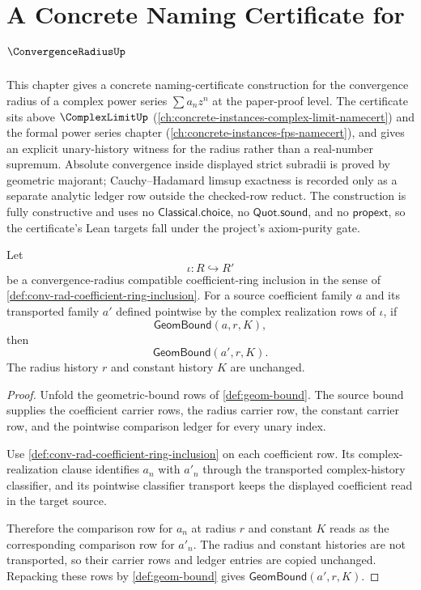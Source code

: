 \chapter{A Concrete Naming Certificate for \(\ConvergenceRadiusUp\)}
\label{ch:concrete-instances-convergence-radius-namecert}

This chapter gives a concrete naming-certificate construction for the convergence radius of a complex power series $\sum a_n z^n$ at the paper-proof level. The certificate sits above $\ComplexLimitUp$ (\autoref{ch:concrete-instances-complex-limit-namecert}) and the formal power series chapter (\autoref{ch:concrete-instances-fps-namecert}), and gives an explicit unary-history witness for the radius rather than a real-number supremum. Absolute convergence inside displayed strict subradii is proved by geometric majorant; Cauchy--Hadamard limsup exactness is recorded only as a separate analytic ledger row outside the checked-row reduct. The construction is fully constructive and uses no $\mathsf{Classical.choice}$, no $\mathsf{Quot.sound}$, and no $\mathsf{propext}$, so the certificate's Lean targets fall under the project's axiom-purity gate.




\begin{theorem}
\label{thm:convrad-coefficient-ring-inclusion-geom-bound-transport}
Let
$$
\iota:R\hookrightarrow R'
$$
be a convergence-radius compatible coefficient-ring inclusion in the sense of
\autoref{def:conv-rad-coefficient-ring-inclusion}. For a source coefficient
family $a$ and its transported family $a'$ defined pointwise by the complex
realization rows of $\iota$, if
$$
\mathsf{GeomBound}(a,r,K),
$$
then
$$
\mathsf{GeomBound}(a',r,K).
$$
The radius history $r$ and constant history $K$ are unchanged.
\end{theorem}
\begin{proof}
Unfold the geometric-bound rows of \autoref{def:geom-bound}. The source bound
supplies the coefficient carrier rows, the radius carrier row, the constant
carrier row, and the pointwise comparison ledger for every unary index.

Use \autoref{def:conv-rad-coefficient-ring-inclusion} on each coefficient
row. Its complex-realization clause identifies $a_n$ with $a'_n$ through the
transported complex-history classifier, and its pointwise classifier transport
keeps the displayed coefficient read in the target source.

Therefore the comparison row for $a_n$ at radius $r$ and constant $K$ reads
as the corresponding comparison row for $a'_n$. The radius and constant
histories are not transported, so their carrier rows and ledger entries are
copied unchanged. Repacking these rows by \autoref{def:geom-bound} gives
$\mathsf{GeomBound}(a',r,K)$.
\end{proof}

